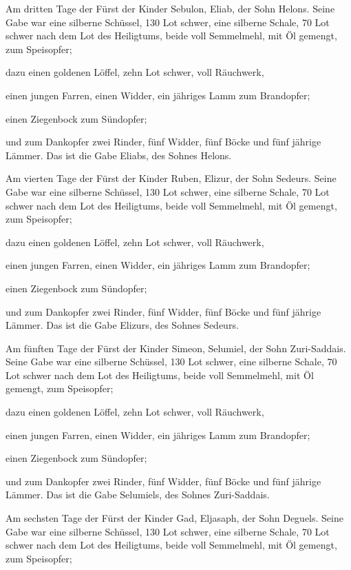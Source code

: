  Am dritten Tage der Fürst der Kinder Sebulon, Eliab, der
Sohn Helons.  Seine Gabe war eine silberne Schüssel, 130
Lot schwer, eine silberne Schale, 70 Lot schwer nach dem Lot des
Heiligtums, beide voll Semmelmehl, mit Öl gemengt, zum Speisopfer;

 dazu einen goldenen Löffel, zehn Lot schwer, voll
Räuchwerk,

 einen jungen Farren, einen Widder, ein jähriges Lamm zum
Brandopfer;

 einen Ziegenbock zum Sündopfer;

 und zum Dankopfer zwei Rinder, fünf Widder, fünf Böcke
und fünf jährige Lämmer. Das ist die Gabe Eliabs, des Sohnes Helons.

 Am vierten Tage der Fürst der Kinder Ruben, Elizur, der
Sohn Sedeurs.  Seine Gabe war eine silberne Schüssel, 130
Lot schwer, eine silberne Schale, 70 Lot schwer nach dem Lot des
Heiligtums, beide voll Semmelmehl, mit Öl gemengt, zum Speisopfer;

 dazu einen goldenen Löffel, zehn Lot schwer, voll
Räuchwerk,

 einen jungen Farren, einen Widder, ein jähriges Lamm zum
Brandopfer;

 einen Ziegenbock zum Sündopfer;

 und zum Dankopfer zwei Rinder, fünf Widder, fünf Böcke
und fünf jährige Lämmer. Das ist die Gabe Elizurs, des Sohnes Sedeurs.

 Am fünften Tage der Fürst der Kinder Simeon, Selumiel,
der Sohn Zuri-Saddais.  Seine Gabe war eine silberne
Schüssel, 130 Lot schwer, eine silberne Schale, 70 Lot schwer nach dem
Lot des Heiligtums, beide voll Semmelmehl, mit Öl gemengt, zum
Speisopfer;

 dazu einen goldenen Löffel, zehn Lot schwer, voll
Räuchwerk,

 einen jungen Farren, einen Widder, ein jähriges Lamm zum
Brandopfer;

 einen Ziegenbock zum Sündopfer;

 und zum Dankopfer zwei Rinder, fünf Widder, fünf Böcke
und fünf jährige Lämmer. Das ist die Gabe Selumiels, des Sohnes
Zuri-Saddais.

 Am sechsten Tage der Fürst der Kinder Gad, Eljasaph, der
Sohn Deguels.  Seine Gabe war eine silberne Schüssel, 130
Lot schwer, eine silberne Schale, 70 Lot schwer nach dem Lot des
Heiligtums, beide voll Semmelmehl, mit Öl gemengt, zum Speisopfer;

